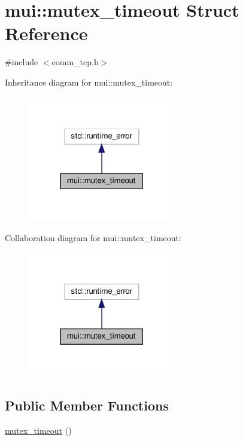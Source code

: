 \hypertarget{structmui_1_1mutex__timeout}{}\section{mui\+:\+:mutex\+\_\+timeout Struct Reference}
\label{structmui_1_1mutex__timeout}


{\ttfamily \#include $<$comm\+\_\+tcp.\+h$>$}



Inheritance diagram for mui\+:\+:mutex\+\_\+timeout\+:
\nopagebreak
\begin{figure}[H]
\begin{center}
\leavevmode
\includegraphics[width=183pt]{structmui_1_1mutex__timeout__inherit__graph}
\end{center}
\end{figure}


Collaboration diagram for mui\+:\+:mutex\+\_\+timeout\+:
\nopagebreak
\begin{figure}[H]
\begin{center}
\leavevmode
\includegraphics[width=183pt]{structmui_1_1mutex__timeout__coll__graph}
\end{center}
\end{figure}
\subsection*{Public Member Functions}
\begin{DoxyCompactItemize}
\item 
\hyperlink{structmui_1_1mutex__timeout_adb40b0f731b2d2b87fed031e10356f38}{mutex\+\_\+timeout} ()
\end{DoxyCompactItemize}


